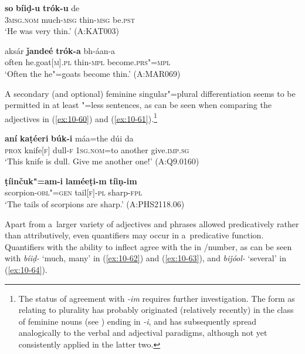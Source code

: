 \begin{exe}
\ex
\label{ex:10-58}
\gll {\ob}\textbf{so}{\cb} {\ob}\textbf{bíiḍ-u} \textbf{trók-u}{\cb} de \\
\textsc{3msg.nom} much-\textsc{msg} thin-\textsc{msg} be.\textsc{pst} \\
\glt `He was very thin.' (A:KAT003)

\ex
\label{ex:10-59}
\gll aksár {\ob}\textbf{ǰandeé}{\cb} {\ob}\textbf{trók-a}{\cb} bh-áan-a \\
often he.goat[\textsc{m}].\textsc{pl} thin-\textsc{mpl} become.\textsc{prs"=mpl} \\
\glt `Often the he"=goats become thin.' (A:MAR069)
\end{exe}


A secondary (and optional) feminine singular"=plural  differentiation seems to be permitted in at least "=less sentences, as can be seen when comparing the adjectives in (\ref{ex:10-60}) and (\ref{ex:10-61}).\footnote{The status of agreement with \textit{-im} requires further investigation. The form as relating to plurality has probably originated (relatively recently) in the class of feminine nouns (see ) ending in \textit{-i}, and has subsequently spread analogically to the verbal and adjectival paradigms, although not yet consistently applied in the latter two.}

\begin{exe}
\ex
\label{ex:10-60}
\gll {\ob}\textbf{aní} \textbf{kaṭéeri}{\cb} {\ob}\textbf{búk-i}{\cb} máa=the dúi da \\
\textsc{prox} knife[\textsc{f}] dull-\textsc{f} \textsc{1sg.nom=}to another give.\textsc{imp.sg} \\
\glt `This knife is dull. Give me another one!' (A:Q9.0160)

\ex
\label{ex:10-61}
\gll {\ob}\textbf{ṭíinčuk"=am-i} \textbf{laméeṭi-m}{\cb} {\ob}\textbf{tíiṇ-im}{\cb} \\ 
scorpion-\textsc{obl"=gen} tail[\textsc{f}]-\textsc{pl } sharp-\textsc{fpl} \\
\glt `The tails of scorpions are sharp.' (A:PHS2118.06)
\end{exe}

Apart from a~larger variety of adjectives and  phrases allowed predicatively rather than attributively, even quantifiers may occur in a~predicative function. Quantifiers with the ability to inflect agree with the    in /number, as can be seen with \textit{bíiḍ-} `much, many' in (\ref{ex:10-62}) and (\ref{ex:10-63}), and \textit{biǰóol-} `several' in (\ref{ex:10-64}).

